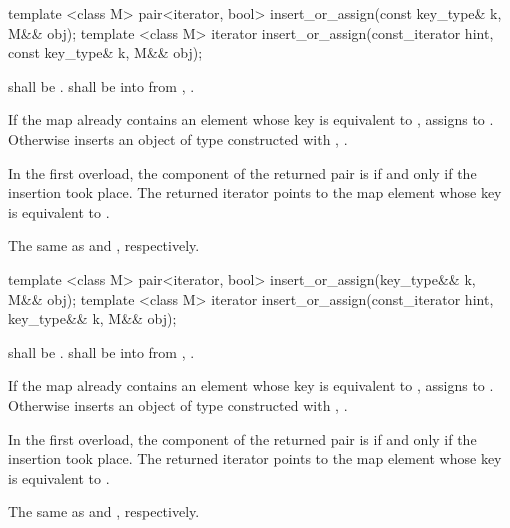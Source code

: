 %
%
\begin{itemdecl}
template <class M> pair<iterator, bool> insert_or_assign(const key_type& k, M&& obj);
template <class M> iterator insert_or_assign(const_iterator hint, const key_type& k, M&& obj);
\end{itemdecl}

\begin{itemdescr}
\pnum
\requires
{} shall be .
 shall be  into 
from , .

\pnum
\effects
If the map already contains an element 
whose key is equivalent to ,
assigns  to .
Otherwise inserts an object of type 
constructed with , .

\pnum
\returns
In the first overload,
the  component of the returned pair is 
if and only if the insertion took place.
The returned iterator points to the map element
whose key is equivalent to .

\pnum
\complexity
The same as  and ,
respectively.
\end{itemdescr}

%
%
\begin{itemdecl}
template <class M> pair<iterator, bool> insert_or_assign(key_type&& k, M&& obj);
template <class M> iterator insert_or_assign(const_iterator hint, key_type&& k, M&& obj);
\end{itemdecl}

\begin{itemdescr}
\pnum
\requires
{} shall be .
 shall be  into 
from , .

\pnum
\effects
If the map already contains an element 
whose key is equivalent to ,
assigns  to .
Otherwise inserts an object of type 
constructed with , .

\pnum
\returns
In the first overload,
the  component of the returned pair is 
if and only if the insertion took place.
The returned iterator points to the map element
whose key is equivalent to .

\pnum
\complexity
The same as  and ,
respectively.
\end{itemdescr}

